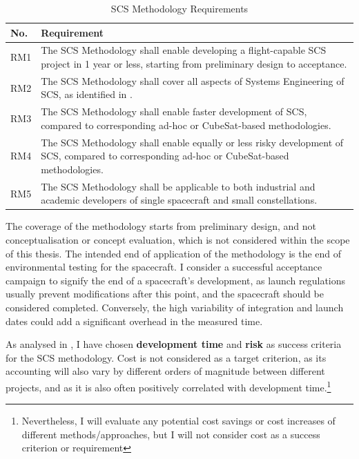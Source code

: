 \documentclass[a4paper,nobib,justified,final]{tufte-book}
\begin{document}
\begin{table}[h]
	\def\arraystretch{1.1}
	\begin{tabularx}{\linewidth}{@{}lX@{}}
		\toprule
		\textbf{No.} & \textbf{Requirement}                                                   \\ \midrule
		RM1            & The SCS Methodology shall enable developing a flight-capable SCS project in 1 year or less, starting from preliminary design to acceptance.  \\
		RM2            & The SCS Methodology shall cover all aspects of Systems Engineering of SCS, as identified in \Cref{sec:INTRODUCTION_defining_systems_engineering}.                 \\
		RM3            & The SCS Methodology shall enable faster development of SCS, compared to corresponding ad-hoc or CubeSat-based methodologies.    \\
		RM4            & The SCS Methodology shall enable equally or less risky development of SCS, compared to corresponding ad-hoc or CubeSat-based methodologies.  \\
		RM5            & The SCS Methodology shall be applicable to both industrial and academic developers of single spacecraft and small constellations. \\
		\bottomrule
	\end{tabularx}
	\caption[SCS Methodology Requirements]{\acs{SCS} Methodology Requirements}
	\label{tab:m_methodology_general_rqeuirements}
\end{table}

The coverage of the methodology starts from preliminary design, and not conceptualisation or concept evaluation, which is not considered within the scope of this thesis. The intended end of application of the methodology is the end of environmental testing for the spacecraft. I consider a successful acceptance campaign to signify the end of a spacecraft's development, as launch regulations usually prevent modifications after this point, and the spacecraft should be considered completed. Conversely, the high variability of integration and launch dates could add a significant overhead in the measured time.

As analysed in , I have chosen \textbf{development time} and \textbf{risk} as success criteria for the \acs{SCS} methodology. Cost is not considered as a target criterion, as its accounting will also vary by different orders of magnitude between different projects, and as it is also often positively correlated with development time.\footnote{Nevertheless, I will evaluate any potential cost savings or cost increases of different methods/approaches, but I will not consider cost as a success criterion or requirement}
\end{document}
